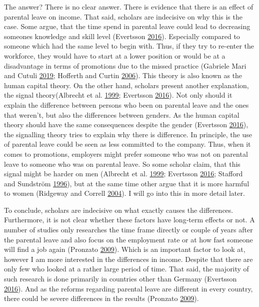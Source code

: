 \documentclass[
  12pt,
]{article}
\begin{document}
The answer? There is no clear answer.
There is evidence that there is an effect of parental leave on income. That said, scholars are indecisive on why this is the case. Some argue, that the time spend in parental leave could lead to decreasing someones knowledge and skill level (Evertsson \protect\hyperlink{ref-evertsson_parental_2016}{2016}). Especially compared to someone which had the same level to begin with. Thus, if they try to re-enter the workforce, they would have to start at a lower position or would be at a disadvantage in terms of promotions due to the missed practice (Gabriele Mari and Cutuli \protect\hyperlink{ref-gabriele_mari_parental_2019}{2019}; Hofferth and Curtin \protect\hyperlink{ref-hofferth_parental_2006}{2006}). This theory is also known as the human capital theory. On the other hand, scholars present another explanation, the signal theory(Albrecht et al. \protect\hyperlink{ref-albrecht_career_1999}{1999}; Evertsson \protect\hyperlink{ref-evertsson_parental_2016}{2016}).
Not only should it explain the difference between persons who been on parental leave and the ones that weren't, but also the differences between genders. As the human capital theory should have the same consequences despite the gender (Evertsson \protect\hyperlink{ref-evertsson_parental_2016}{2016}), the signalling theory tries to explain why there is difference. In principle, the use of parental leave could be seen as less committed to the company. Thus, when it comes to promotions, employers might prefer someone who was not on parental leave to someone who was on parental leave. So some scholar claim, that this signal might be harder on men (Albrecht et al. \protect\hyperlink{ref-albrecht_career_1999}{1999}; Evertsson \protect\hyperlink{ref-evertsson_parental_2016}{2016}; Stafford and Sundström \protect\hyperlink{ref-stafford_time_1996}{1996}), but at the same time other argue that it is more harmful to women (Ridgeway and Correll \protect\hyperlink{ref-ridgeway_unpacking_2004}{2004}). I will go into this in more detail later.

To conclude, scholars are indecisive on what exactly causes the differences. Furthermore, it is not clear whether these factors have long-term effects or not. A number of studies only researches the time frame directly or couple of years after the parental leave and also focus on the employment rate or at how fast someone will find a job again (Pronzato \protect\hyperlink{ref-pronzato_return_2009}{2009}). Which is an important factor to look at, however I am more interested in the differences in income. Despite that there are only few who looked at a rather large period of time. That said, the majority of such research is done primarily in countries other than Germany (Evertsson \protect\hyperlink{ref-evertsson_parental_2016}{2016}). And as the reforms regarding parental leave are different in every country, there could be severe differences in the results (Pronzato \protect\hyperlink{ref-pronzato_return_2009}{2009}).
\end{document}
